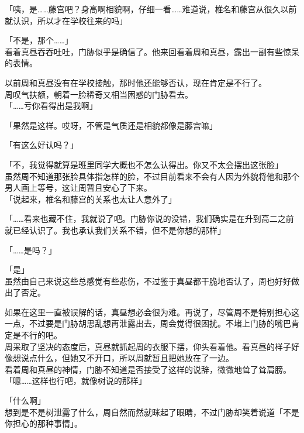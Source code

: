 「咦，是……藤宫吧？身高啊相貌啊，仔细一看……难道说，椎名和藤宫从很久以前就认识，所以才在学校往来的吗」

「不是，那个……」\\

看着真昼吞吞吐吐，门胁似乎是确信了。他来回看着周和真昼，露出一副有些惊呆的表情。

以前周和真昼没有在学校接触，那时他还能够否认，现在肯定是不行了。\\

周叹气扶额，朝着一脸稀奇又相当困惑的门胁看去。\\

「……亏你看得出是我啊」

「果然是这样。哎呀，不管是气质还是相貌都像是藤宫嘛」

「有这么好认吗？」

「不，我觉得就算是班里同学大概也不怎么认得出。你又不太会摆出这张脸」\\

虽然周不知道那张脸具体指怎样的脸，不过目前看来不会有人因为外貌将他和那个男人画上等号，这让周暂且安心了下来。\\

「说起来，椎名和藤宫的关系也太让人意外了」

「……看来也藏不住，我就说了吧。门胁你说的没错，我们确实是在升到高二之前就已经认识了。我也承认我们关系不错，但不是你想的那样」

「……是吗？」

「是」\\

虽然由自己来说这些总感觉有些悲伤，不过鉴于真昼都干脆地否认了，周也好好做出了否定。

如果在这里一直被误解的话，真昼想必会很为难。再说了，尽管周不是特别担心这一点，不过要是门胁胡思乱想再泄露出去，周会觉得很困扰。不堵上门胁的嘴巴肯定是不行的吧。\\

周采取了坚决的态度后，真昼就抓起周的衣服下摆，仰头看着他。看真昼的样子好像想说点什么，但她又不开口，所以周就暂且把她放在了一边。\\

看着周和真昼的神情，门胁不知道是否接受了这样的说辞，微微地耸了耸肩膀。\\

「嗯……这样也行吧，就像树说的那样」

「什么啊」\\

想到是不是树泄露了什么，周自然而然就眯起了眼睛，不过门胁却笑着说道「不是你担心的那种事情」。\\

